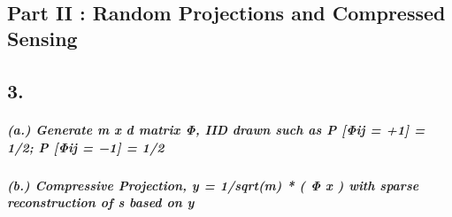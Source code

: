 \documentclass[11pt]{article}
\begin{document}
    \begin{center}
    \end{center}
    { \hspace*{\fill} \\}
    
    \subsection{Part II : Random Projections and Compressed
Sensing}\label{part-ii-random-projections-and-compressed-sensing}

\subsection{3.}\label{section}

\subparagraph{(a.) Generate m x d matrix Φ, IID drawn such as P {[}Φij =
+1{]} = 1/2; P {[}Φij = −1{]} =
1/2}\label{a.-generate-m-x-d-matrix-ux3c6-iid-drawn-such-as-p-ux3c6ij-1-12-p-ux3c6ij-1-12}

\subparagraph{(b.) Compressive Projection, y = 1/sqrt(m) * ( Φ x ) with
sparse reconstruction of s based on
y}\label{b.-compressive-projection-y-1sqrtm-ux3c6-x-with-sparse-reconstruction-of-s-based-on-y}
\end{document}
